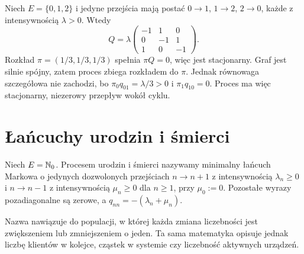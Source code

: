 \begin{przyklad}
Niech $E=\{0,1,2\}$ i jedyne przejścia mają postać
$0\to1$, $1\to2$, $2\to0$, każde z intensywnością
$\lambda>0$. Wtedy
\[
Q=\lambda\begin{pmatrix}-1&1&0\\0&-1&1\\1&0&-1\end{pmatrix}.
\]
Rozkład $\pi=(1/3,1/3,1/3)$ spełnia $\pi Q=0$,
więc jest stacjonarny. Graf jest silnie spójny,
zatem proces zbiega rozkładem do $\pi$.
Jednak równowaga szczegółowa nie zachodzi, bo
$\pi_0q_{01}=\lambda/3>0$ i $\pi_1q_{10}=0$.
Proces ma więc stacjonarny, niezerowy przepływ wokół cyklu.
\end{przyklad}

\section{Łańcuchy urodzin i śmierci}
\begin{definicja}
Niech $E=\mathbb{N}_0$. Procesem urodzin i śmierci nazywamy
minimalny łańcuch Markowa o jedynych dozwolonych przejściach
$n\to n+1$ z intensywnością $\lambda_n\ge0$ i
$n\to n-1$ z intensywnością $\mu_n\ge0$ dla $n\ge1$,
przy $\mu_0:=0$. Pozostałe wyrazy pozadiagonalne są zerowe,
a $q_{nn}=-(\lambda_n+\mu_n)$.
\end{definicja}

Nazwa nawiązuje do populacji, w której każda zmiana liczebności
jest zwiększeniem lub zmniejszeniem o jeden. Ta sama
matematyka opisuje jednak liczbę klientów w kolejce, cząstek
w systemie czy liczebność aktywnych urządzeń.

